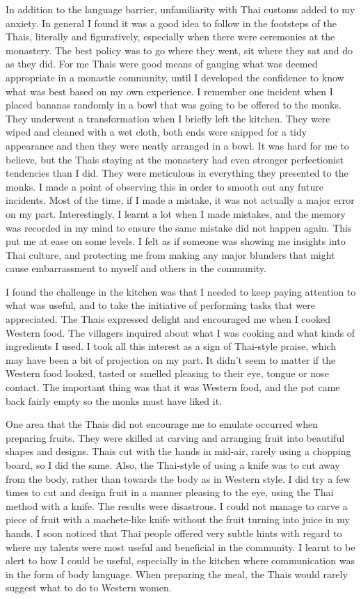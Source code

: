 In addition to the language barrier, unfamiliarity with Thai customs
added to my anxiety. In general I found it was a good idea to follow in
the footsteps of the Thais, literally and figuratively, especially when
there were ceremonies at the monastery. The best policy was to go where
they went, sit where they sat and do as they did. For me Thais were good
means of gauging what was deemed appropriate in a monastic community,
until I developed the confidence to know what was best based on my own
experience. I remember one incident when I placed bananas randomly in a
bowl that was going to be offered to the monks. They underwent a
transformation when I briefly left the kitchen. They were wiped and
cleaned with a wet cloth, both ends were snipped for a tidy appearance
and then they were neatly arranged in a bowl. It was hard for me to
believe, but the Thais staying at the monastery had even stronger
perfectionist tendencies than I did. They were meticulous in everything
they presented to the monks. I made a point of observing this in order
to smooth out any future incidents. Most of the time, if I made a
mistake, it was not actually a major error on my part. Interestingly, I
learnt a lot when I made mistakes, and the memory was recorded in my
mind to ensure the same mistake did not happen again. This put me at
ease on some levels. I felt as if someone was showing me insights into
Thai culture, and protecting me from making any major blunders that
might cause embarrassment to myself and others in the community.

I found the challenge in the kitchen was that I needed to keep paying
attention to what was useful, and to take the initiative of performing
tasks that were appreciated. The Thais expressed delight and encouraged
me when I cooked Western food. The villagers inquired about what I was
cooking and what kinds of ingredients I used. I took all this interest
as a sign of Thai-style praise, which may have been a bit of projection
on my part. It didn't seem to matter if the Western food looked, tasted
or smelled pleasing to their eye, tongue or nose contact. The important
thing was that it was Western food, and the pot came back fairly empty
so the monks must have liked it.

One area that the Thais did not encourage me to emulate occurred when
preparing fruits. They were skilled at carving and arranging fruit into
beautiful shapes and designs. Thais cut with the hands in mid-air,
rarely using a chopping board, so I did the same. Also, the Thai-style
of using a knife was to cut away from the body, rather than towards the
body as in Western style. I did try a few times to cut and design fruit
in a manner pleasing to the eye, using the Thai method with a knife. The
results were disastrous. I could not manage to carve a piece of fruit
with a machete-like knife without the fruit turning into juice in my
hands. I soon noticed that Thai people offered very subtle hints with
regard to where my talents were most useful and beneficial in the
community. I learnt to be alert to how I could be useful, especially in
the kitchen where communication was in the form of body language. When
preparing the meal, the Thais would rarely suggest what to do to Western
women.

